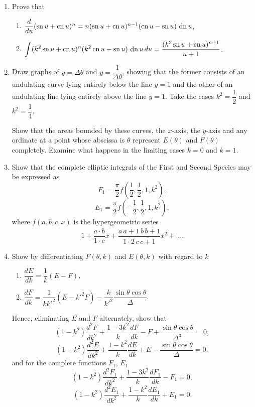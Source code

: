 \documentclass[11pt, a4paper]{article}
\begin{document}
\begin{enumerate}[leftmargin=2em]
\item Prove that
\begin{enumerate}[label=(\arabic*)]
\item $\dfrac{d}{du}(\operatorname{sn} u+\operatorname{cn} u)^n=n(\operatorname{sn} u+\operatorname{cn} u)^{n-1}(\operatorname{cn} u-\operatorname{sn} u)\,\operatorname{dn} u$,
\item $\displaystyle\int (k^2\operatorname{sn} u+\operatorname{cn} u)^n(k^2\operatorname{cn} u-\operatorname{sn} u)\,\operatorname{dn} u\,du=\dfrac{(k^2\operatorname{sn} u+\operatorname{cn} u)^{n+1}}{n+1}$.
\end{enumerate}

\item Draw graphs of $y=\Delta\theta$ and $y=\dfrac1{\Delta\theta}$, showing that the former consists of an undulating curve lying entirely below the line $y=1$ and the other of an undulating line lying entirely above the line $y=1$. Take the cases $k^2=\dfrac12$ and $k^2=\dfrac14$.

Show that the areas bounded by these curves, the $x$-axis, the $y$-axis and any ordinate at a point whose abscissa is $\theta$ represent $E(\theta)$ and $F(\theta)$ completely. Examine what happens in the limiting cases $k=0$ and $k=1$.

\item Show that the complete elliptic integrals of the First and Second Species may be expressed as
\[
F_1=\frac{\pi}{2}f\left(\frac12,\frac12,1,k^2\right),
\]
\[
E_1=\frac{\pi}{2}f\left(-\frac12,\frac12,1,k^2\right),
\]
where $f(a,b,c,x)$ is the hypergeometric series
\[
1+\frac{a\cdot b}{1\cdot c}x+\frac{a\,\overline{a+1}\ b\,\overline{b+1}}{1\cdot2\ c\,\overline{c+1}}x^2+\dots.
\]

\item Show by differentiating $F(\theta,k)$ and $E(\theta,k)$ with regard to $k$
\begin{enumerate}[label=(\arabic*)]
\item $\dfrac{dE}{dk}=\dfrac1k(E-F)$,
\item $\dfrac{dF}{dk}=\dfrac1{kk'^2}(E-k'^2F)-\dfrac{k}{k'^2}\dfrac{\sin\theta\cos\theta}{\Delta}$.
\end{enumerate}

Hence, eliminating $E$ and $F$ alternately, show that
\[
(1-k^2)\frac{d^2F}{dk^2}+\frac{1-3k^2}{k}\frac{dF}{dk}-F+\frac{\sin\theta\cos\theta}{\Delta^3}=0,
\]
\[
(1-k^2)\frac{d^2E}{dk^2}+\frac{1-k^2}{k}\frac{dE}{dk}+E-\frac{\sin\theta\cos\theta}{\Delta}=0,
\]
and for the complete functions $F_1$, $E_1$
\[
(1-k^2)\frac{d^2F_1}{dk^2}+\frac{1-3k^2}{k}\frac{dF_1}{dk}-F_1=0,
\]
\[
(1-k^2)\frac{d^2E_1}{dk^2}+\frac{1-k^2}{k}\frac{dE_1}{dk}+E_1=0.
\]

\end{enumerate}
\end{document}

